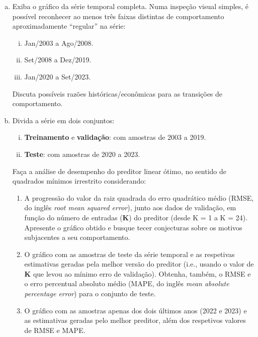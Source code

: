 \documentclass[final,5p]{elsarticle}
\numberwithin{equation}{section}
\begin{document}
    \begin{enumerate}[(a)]
        \item Exiba o gráfico da série temporal completa. Numa inspeção visual simples, é possível reconhecer ao menos três faixas distintas de comportamento aproximadamente “regular” na série:

        \begin{enumerate}[(i)]
            \item Jan/2003 a Ago/2008.
            \item Set/2008 a Dez/2019.
            \item Jan/2020 a Set/2023.
        \end{enumerate}

        Discuta possíveis razões históricas/econômicas para as transições de comportamento.

        \item Divida a série em dois conjuntos:

        \begin{enumerate}[(i)]
            \item \textbf{Treinamento} e \textbf{validação}: com amostras de 2003 a 2019.
            \item \textbf{Teste}: com amostras de 2020 a 2023.
        \end{enumerate}

        Faça a análise de desempenho do preditor linear ótimo, no sentido de quadrados mínimos irrestrito considerando:

        \begin{enumerate}[(1)]
            \item A progressão do valor da raiz quadrada do erro quadrático médio (RMSE, do inglês \emph{root mean squared error}), junto aos dados de validação, em função do número de entradas (\textbf{K}) do preditor (desde K = 1 a K = 24). Apresente o gráfico obtido e busque tecer conjecturas sobre os motivos subjacentes a seu comportamento. \label{item:b1}
            \item O gráfico com as amostras de teste da série temporal e as respetivas estimativas geradas pela melhor versão do preditor (i.e., usando o valor de \textbf{K} que levou ao mínimo erro de validação). Obtenha, também, o RMSE e o erro percentual absoluto médio (MAPE, do inglês \emph{mean absolute percentage error}) para o conjunto de teste.  \label{item:b2}
            \item O gráfico com as amostras apenas dos dois últimos anos (2022 e 2023) e as estimativas geradas pelo melhor preditor, além dos respetivos valores de RMSE e MAPE.  \label{item:b3}
        \end{enumerate}


\end{enumerate}
\end{document}
